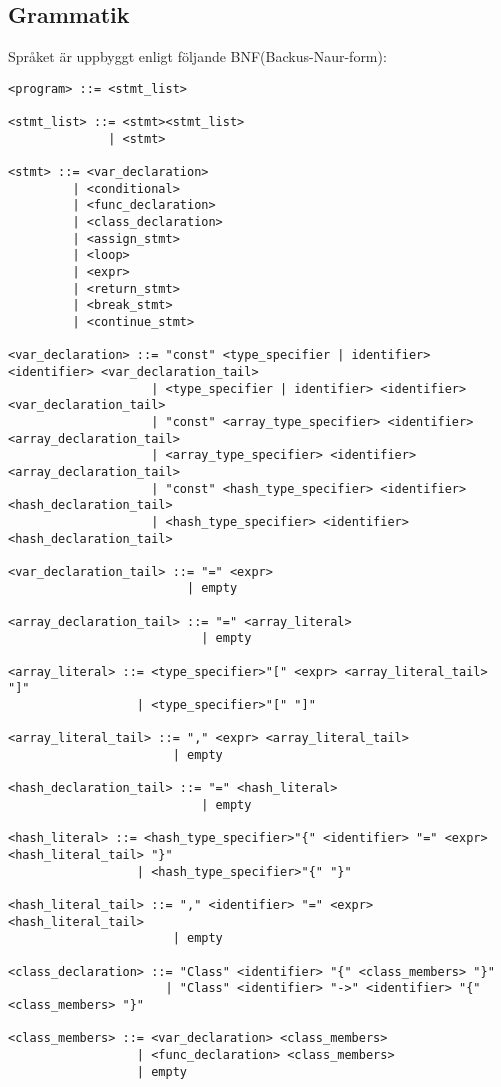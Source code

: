 \documentclass{TDP003mall}
\begin{document}
\subsection{Grammatik}\label{sec:BNF}
Språket är uppbyggt enligt följande BNF(Backus-Naur-form):
\newline
\begin{verbatim}
<program> ::= <stmt_list>

<stmt_list> ::= <stmt><stmt_list>
              | <stmt>

<stmt> ::= <var_declaration> 
         | <conditional>
         | <func_declaration>
         | <class_declaration>
         | <assign_stmt>
         | <loop>
         | <expr>
         | <return_stmt>
         | <break_stmt>
         | <continue_stmt>

<var_declaration> ::= "const" <type_specifier | identifier> <identifier> <var_declaration_tail>
                    | <type_specifier | identifier> <identifier> <var_declaration_tail>
                    | "const" <array_type_specifier> <identifier> <array_declaration_tail>
                    | <array_type_specifier> <identifier> <array_declaration_tail>
                    | "const" <hash_type_specifier> <identifier> <hash_declaration_tail>
                    | <hash_type_specifier> <identifier> <hash_declaration_tail>

<var_declaration_tail> ::= "=" <expr>
                         | empty

<array_declaration_tail> ::= "=" <array_literal>
                           | empty

<array_literal> ::= <type_specifier>"[" <expr> <array_literal_tail> "]"
                  | <type_specifier>"[" "]"

<array_literal_tail> ::= "," <expr> <array_literal_tail>
                       | empty

<hash_declaration_tail> ::= "=" <hash_literal>
                           | empty

<hash_literal> ::= <hash_type_specifier>"{" <identifier> "=" <expr> <hash_literal_tail> "}"
                  | <hash_type_specifier>"{" "}"

<hash_literal_tail> ::= "," <identifier> "=" <expr>  <hash_literal_tail>
                       | empty

<class_declaration> ::= "Class" <identifier> "{" <class_members> "}"
                      | "Class" <identifier> "->" <identifier> "{" <class_members> "}"

<class_members> ::= <var_declaration> <class_members>
                  | <func_declaration> <class_members>
                  | empty


\end{verbatim}
\end{document}
